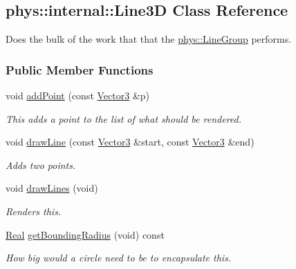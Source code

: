 \hypertarget{classphys_1_1internal_1_1Line3D}{
\subsection{phys::internal::Line3D Class Reference}
\label{classphys_1_1internal_1_1Line3D}
}


Does the bulk of the work that that the \hyperlink{classphys_1_1LineGroup}{phys::LineGroup} performs.  


\subsubsection*{Public Member Functions}
\begin{DoxyCompactItemize}
\item 
void \hyperlink{classphys_1_1internal_1_1Line3D_aeb3b828b35b4c8ed76158285be6ddc67}{addPoint} (const \hyperlink{classphys_1_1Vector3}{Vector3} \&p)
\begin{DoxyCompactList}\small\item\em This adds a point to the list of what should be rendered. \item\end{DoxyCompactList}\item 
void \hyperlink{classphys_1_1internal_1_1Line3D_a31bf19dc06547cbe042e1ddfbcf672f3}{drawLine} (const \hyperlink{classphys_1_1Vector3}{Vector3} \&start, const \hyperlink{classphys_1_1Vector3}{Vector3} \&end)
\begin{DoxyCompactList}\small\item\em Adds two points. \item\end{DoxyCompactList}\item 
void \hyperlink{classphys_1_1internal_1_1Line3D_a008f0874c2213002e0c39330561f80f2}{drawLines} (void)
\begin{DoxyCompactList}\small\item\em Renders this. \item\end{DoxyCompactList}\item 
\hyperlink{namespacephys_af7eb897198d265b8e868f45240230d5f}{Real} \hyperlink{classphys_1_1internal_1_1Line3D_a3fdd0ff2b7b22cebc71f796431afc7c8}{getBoundingRadius} (void) const 
\begin{DoxyCompactList}\small\item\em How big would a circle need to be to encapsulate this. \item\end{DoxyCompactList}\item 

\end{DoxyCompactItemize}
